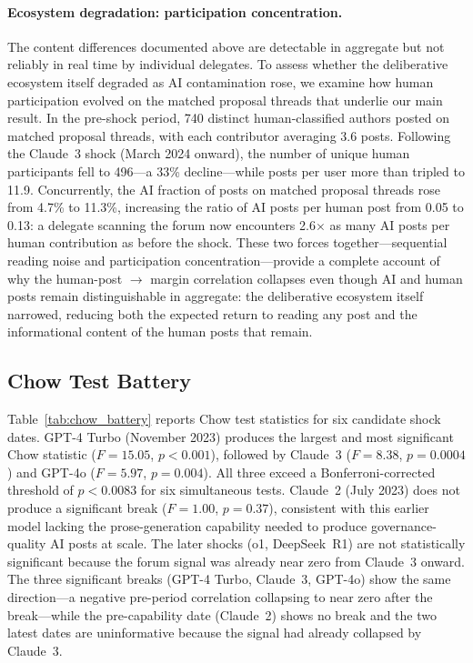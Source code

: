\documentclass[12pt]{article}
\newcommand{\FloatBarrier}{\par}
\begin{document}
\paragraph{Ecosystem degradation: participation concentration.}
The content differences documented above are detectable in aggregate but not
reliably in real time by individual delegates. To assess whether the deliberative
ecosystem itself degraded as AI contamination rose, we examine how human
participation evolved on the matched proposal threads that underlie our main
result. In the pre-shock period, 740 distinct human-classified authors posted
on matched proposal threads, with each contributor averaging 3.6 posts. Following
the Claude~3 shock (March 2024 onward), the number of unique human participants
fell to 496---a 33\% decline---while posts per user more than tripled to 11.9. Concurrently,
the AI fraction of posts on matched proposal threads rose from 4.7\% to 11.3\%,
increasing the ratio of AI posts per human post from 0.05 to 0.13: a delegate
scanning the forum now encounters 2.6$\times$ as many AI posts per
human contribution as before the shock. These two forces together---sequential
reading noise and participation concentration---provide a complete account of
why the human-post $\to$ margin correlation collapses even though AI and human
posts remain distinguishable in aggregate: the deliberative ecosystem itself
narrowed, reducing both the expected return to reading any post and the
informational content of the human posts that remain.

\FloatBarrier
\subsection{Chow Test Battery}

Table~\ref{tab:chow_battery} reports Chow test statistics for six candidate
shock dates. GPT-4 Turbo (November 2023) produces the largest and most significant
Chow statistic ($F = 15.05$, $p < 0.001$), followed by Claude~3 ($F = 8.38$,
$p = 0.0004$) and GPT-4o ($F = 5.97$, $p = 0.004$). All three exceed a
Bonferroni-corrected threshold of $p < 0.0083$ for six simultaneous tests.
Claude~2 (July 2023) does not produce a significant break ($F = 1.00$, $p = 0.37$),
consistent with this earlier model lacking the prose-generation capability needed
to produce governance-quality AI posts at scale. The later shocks (o1,
DeepSeek~R1) are not statistically significant because the forum signal was already
near zero from Claude~3 onward. The three significant breaks (GPT-4 Turbo, Claude~3,
GPT-4o) show the same direction---a negative pre-period correlation collapsing to
near zero after the break---while the pre-capability date (Claude~2) shows no break
and the two latest dates are uninformative because the signal had already collapsed
by Claude~3.
\end{document}
